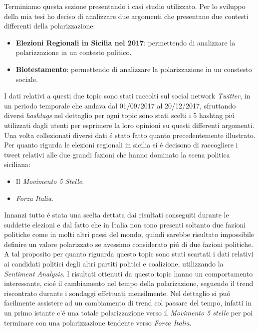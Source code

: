 Terminiamo questa sezione presentando i casi studio utilizzato. Per lo sviluppo della mia tesi ho deciso di analizzare  due argomenti che presentano due contesti differenti della polarizzazione:
\begin{itemize}
\item \textbf{Elezioni Regionali in Sicilia nel 2017}: permettendo di analizzare la polarizzazione in un contesto politico.
\item \textbf{Biotestamento}: permettendo di analizzare la polarizzazione in un constesto sociale.
\end{itemize}
I dati relativi a questi due topic sono stati raccolti sul social network \textit{Twitter}, in un periodo temporale che andava dal 01/09/2017 al 20/12/2017, sfruttando diversi \textit{hashtags} nel dettaglio per ogni topic sono stati scelti i 5 hashtag pi\'u utilizzati dagli utenti per esprimere la loro opinioni su questi differenti argomenti. Una volta collezionati diversi dati \'e stato fatto quanto precedentemente illustrato. 
Per quanto rigurda le elezioni regionali in sicilia si \'e decisono di raccogliere i tweet relativi alle due grandi fazioni che hanno dominato la scena politica siciliana:
\begin{itemize}
\item  Il \textit{Movimento 5 Stelle}. 
\item \textit{Forza Italia}.
\end{itemize}
Innanzi tutto \'e stata una scelta dettata dai risultati conseguiti durante le suddette elezioni e dal fatto che in Italia non sono presenti soltanto due fazioni politiche come in molti altri paesi del mondo, quindi sarebbe risultato impossibile definire un valore polarizzato se avessimo considerato pi\'u di due fazioni politiche.
A tal proposito per quanto riguarda questo topic sono stati scartati i dati relativi ai candidati politici degli altri partiti politici e coalizione, utilizzando la \textit{Sentiment Analysis}.
I risultati ottenuti da questo topic hanno un comportamento interessante, cio\'e il cambiamento nel tempo della polarizazione, seguendo il trend riscontrato durante i sondaggi effettuati mensilmente. Nel dettaglio si pu\'o facilmente assistere ad un cambiamento di trend col passare del tempo, infatti in un primo istante c'\'e una totale polarizzazione verso il \textit{Movimento 5 stelle} per poi terminare con una polarizzazione tendente verso \textit{Forza Italia}.

